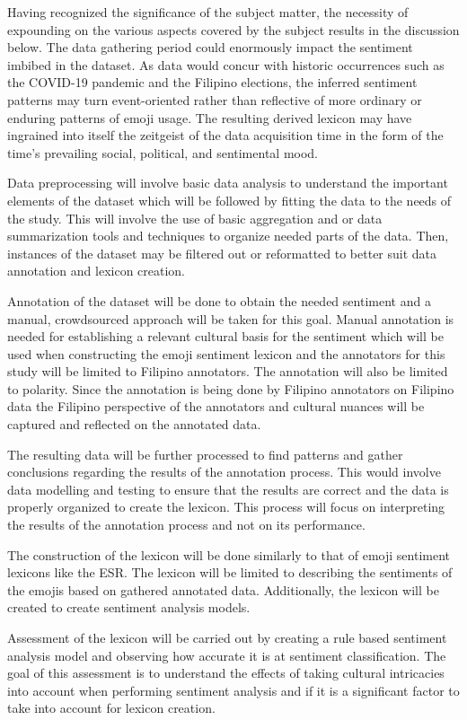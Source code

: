 Having recognized the significance of the subject matter, the necessity of expounding on the various aspects covered by the subject results in the discussion below. The data gathering period could enormously impact the sentiment imbibed in the dataset. As data would concur with historic occurrences such as the COVID-19 pandemic and the Filipino elections, the inferred sentiment patterns may turn event-oriented rather than reflective of more ordinary or enduring patterns of emoji usage. The resulting derived lexicon may have ingrained into itself the zeitgeist of the data acquisition time in the form of the time's prevailing social, political, and sentimental mood.

Data preprocessing will involve basic data analysis to understand the important elements of the dataset which will be followed by fitting the data to the needs of the study. This will involve the use of basic aggregation and or data summarization tools and techniques to organize needed parts of the data. Then, instances of the dataset may be filtered out or reformatted to better suit data annotation and lexicon creation. 

Annotation of the dataset will be done to obtain the needed sentiment and a manual, crowdsourced approach will be taken for this goal. Manual annotation is needed for establishing a relevant cultural basis for the sentiment which will be used when constructing the emoji sentiment lexicon and the annotators for this study will be limited to Filipino annotators. The annotation will also be limited to polarity. Since the annotation is being done by Filipino annotators on Filipino data the Filipino perspective of the annotators and cultural nuances will be captured and reflected on the annotated data.

The resulting data will be further processed to find patterns and gather conclusions regarding the results of the annotation process. This would involve data modelling and testing to ensure that the results are correct and the data is properly organized to create the lexicon. This process will focus on interpreting the results of the annotation process and not on its performance.

The construction of the lexicon will be done similarly to that of emoji sentiment lexicons like the ESR. The lexicon will be limited to describing the sentiments of the emojis based on gathered annotated data. Additionally, the lexicon will be created to create sentiment analysis models.

Assessment of the lexicon will be carried out by creating a rule based sentiment analysis model and observing how accurate it is at sentiment classification. The goal of this assessment is to understand the effects of taking cultural intricacies into account when performing sentiment analysis and if it is a significant factor to take into account for lexicon creation.

